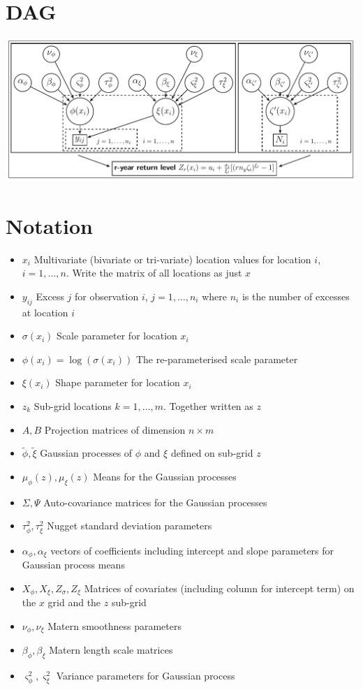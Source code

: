 \documentclass{article}
\begin{document}
\newpage

\section{DAG}

\includegraphics[scale = 0.8]{DAG2.pdf}

\section{Notation}

\begin{itemize}
\item $x_i$ Multivariate (bivariate or tri-variate) location values for location $i$, $i = 1,\ldots, n$. Write the matrix of all locations as just $x$
\item $y_{ij}$ Excess $j$ for observation $i$, $j = 1,\ldots,n_i$ where $n_i$ is the number of excesses at location $i$
\item $\sigma(x_i)$ Scale parameter for location $x_i$
\item $\phi(x_i) = \log(\sigma(x_i))$ The re-parameterised scale parameter
\item $\xi(x_i)$ Shape parameter for location $x_i$
\item $z_k$ Sub-grid locations $k = 1, \ldots, m$. Together written as $z$
\item $A, B$ Projection matrices of dimension $n \times m$
\item $\tilde{\phi}, \tilde{\xi}$ Gaussian processes of $\phi$ and $\xi$ defined on sub-grid $z$
\item $\mu_\phi(z), \mu_\xi(z)$ Means for the Gaussian processes
\item $\Sigma, \Psi$ Auto-covariance matrices for the Gaussian processes
\item $\tau^2_\phi, \tau^2_\xi$ Nugget standard deviation parameters
\item $\alpha_\phi, \alpha_\xi$ vectors of coefficients including intercept and slope parameters for Gaussian process means
\item $X_\phi, X_\xi, Z_\sigma, Z_\xi$ Matrices of covariates (including column for intercept term) on the $x$ grid and the $z$ sub-grid
\item $\nu_\phi, \nu_\xi$ Matern smoothness parameters
\item $\beta_\phi, \beta_\xi$ Matern length scale matrices
\item $\varsigma^2_\phi, \varsigma^2_\xi$ Variance parameters for Gaussian process
\end{itemize}
\end{document}
